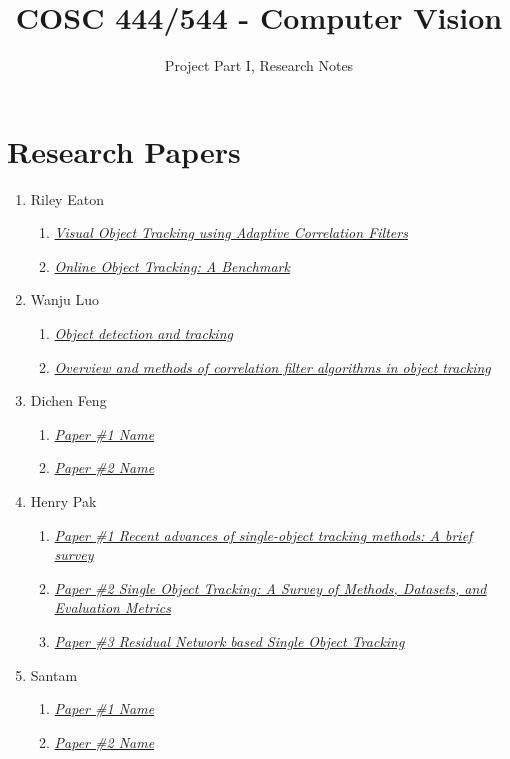 \documentclass{article}
\title{COSC 444/544 - Computer Vision}
\author{Project Part I, Research Notes}
\begin{document}
\maketitle

\section*{Research Papers}

\begin{enumerate}
\item Riley Eaton
  \begin{enumerate}[label*=\arabic*.]
  \item \textit{\href{https://typeset.io/papers/visual-object-tracking-using-adaptive-correlation-filters-1xuhtpe358}{Visual Object Tracking using Adaptive Correlation Filters}}
  \item \textit{\href{https://faculty.ucmerced.edu/mhyang/papers/cvpr13_benchmark.pdf}{Online Object Tracking: A Benchmark}}
  \end{enumerate}
\item Wanju Luo
  \begin{enumerate}[label*=\arabic*.]
  \item \textit{\href{https://www.sciencedirect.com/science/article/pii/B9780323857871000166?via%3Dihub}{Object detection and tracking}}
  \item \textit{\href{https://link.springer.com/article/10.1007/s40747-020-00161-4}{Overview and methods of correlation filter algorithms in object tracking}}
  \end{enumerate}
\item Dichen Feng
  \begin{enumerate}[label*=\arabic*.]
  \item \textit{\href{paper_link_here}{Paper \#1 Name}}
  \item \textit{\href{paper_link_here}{Paper \#2 Name}}
  \end{enumerate}
\item Henry Pak
  \begin{enumerate}[label*=\arabic*.]
  \item \textit{\href{https://www.sciencedirect.com/science/article/pii/S0925231221007220}{Paper \#1 Recent advances of single-object tracking methods: A brief survey}}
  \item \textit{\href{https://arxiv.org/abs/2201.13066}{Paper \#2 Single Object Tracking: A Survey of Methods, Datasets, and Evaluation Metrics}}
  \item \textit{\href{https://ieeexplore.ieee.org/document/9774086}{Paper \#3 Residual Network based Single Object Tracking}}
  \end{enumerate}
\item Santam
  \begin{enumerate}[label*=\arabic*.]
  \item \textit{\href{paper_link_here}{Paper \#1 Name}}
  \item \textit{\href{paper_link_here}{Paper \#2 Name}}
  \end{enumerate}
\end{enumerate}
\end{document}
